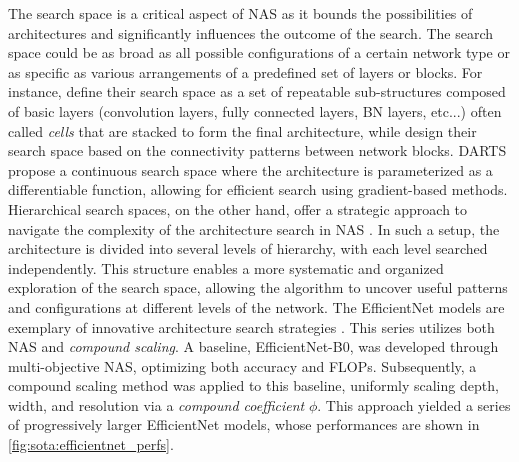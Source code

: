 The search space is a critical aspect of \ac{NAS} as it bounds the possibilities
of architectures and significantly influences the outcome of the search. The
search space could be as broad as all possible configurations of a certain
network type or as specific as various arrangements of a predefined set of
layers or blocks. For instance, \cite{DBLP:conf/iclr/ZophL17} define their
search space as a set of repeatable sub-structures composed of basic layers
(convolution layers, fully connected layers, \ac{BN} layers, etc...) often
called \emph{cells} that are stacked to form the final architecture, while
\cite{DBLP:conf/iclr/XieZLL19} design their search space based on the
connectivity patterns between network blocks. DARTS
\cite{DBLP:conf/iclr/LiuSY19} propose a continuous search space where the
architecture is parameterized as a differentiable function, allowing for
efficient search using gradient-based methods. Hierarchical search spaces, on
the other hand, offer a strategic approach to navigate the complexity of the
architecture search in \ac{NAS}
\cite{DBLP:conf/cvpr/LiuCSAHY019,DBLP:conf/cvpr/TanCPVSHL19}. In such a setup,
the architecture is divided into several levels of hierarchy, with each level
searched independently. This structure enables a more systematic and organized
exploration of the search space, allowing the algorithm to uncover useful
patterns and configurations at different levels of the network. The EfficientNet
models are exemplary of innovative architecture search strategies
\cite{DBLP:conf/icml/TanL19}. This series utilizes both \ac{NAS} and
\emph{compound scaling}. A baseline, EfficientNet-B0, was developed through
multi-objective \ac{NAS}, optimizing both accuracy and \acp{FLOP}. Subsequently,
a compound scaling method was applied to this baseline, uniformly scaling depth,
width, and resolution via a \emph{compound coefficient} $\phi$. This approach
yielded a series of progressively larger EfficientNet models, whose performances
are shown in \ref{fig:sota:efficientnet_perfs}.\\\


